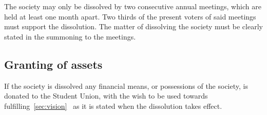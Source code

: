 \documentclass[a4paper]{article}
\begin{document}
The society may only be dissolved by two consecutive annual meetings, which are
held at least one month apart.  Two thirds of the present voters of said
meetings must support the dissolution.  The matter of dissolving the society
must be clearly stated in the summoning to the meetings.

\subsection{Granting of assets}

If the society is dissolved any financial means, or possessions of the society,
is donated to the Student Union, with the wish to be used towards
fulfilling~\ref{sec:vision}~ as it is stated when the
dissolution takes effect.
\end{document}
